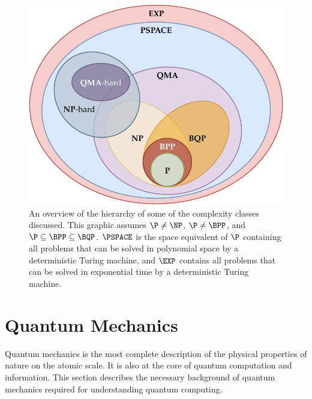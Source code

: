 \begin{figure}[ht]
    \centering
    \includegraphics[width=0.6\linewidth]{figures/complexity-classes-hierarchy.pdf}
    \caption[An overview of the hierarchy of some of the complexity classes discussed.]{
        An overview of the hierarchy of some of the complexity classes discussed.
        This graphic assumes $\P \neq \NP$, $\P \neq \BPP$, and $\P \subseteq \BPP \subseteq \BQP$.
        $\PSPACE$ is the space equivalent of $\P$ containing all problems that can be solved in polynomial space by a deterministic Turing machine, and $\EXP$ contains all problems that can be solved in exponential time by a deterministic Turing machine.
    }
    \label{fig:complexity-classes-hierarchy}
\end{figure}

\section{Quantum Mechanics}
Quantum mechanics is the most complete description of the physical properties of nature on the atomic scale.
It is also at the core of quantum computation and information.
This section describes the necessary background of quantum mechanics required for understanding quantum computing.

